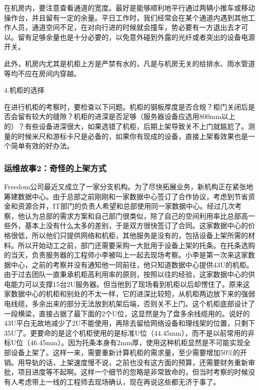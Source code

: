 \documentclass[12pt,UTF8]{ctexbook}
\begin{document}
在机房内，要注意查看通道的宽度。最好是能够顺利地平行通过两辆小推车或移动操作台，并且留有一定的余量。平日工作时，我们经常会在某个通道内遇到其他工作人员，通道空间不足，在对向行进的时候就会撞车，势必要有一方退出去才可以。留有足够余量也是十分必要的，以免意外碰到外露的光纤或者突出的设备电源开关。

此外，机房内尤其是机柜上方是严禁有水的，凡是与机房无关的给排水、雨水管道等均不应在房间内穿越。

4.机柜的选择

在进行机柜的考察时，要检查以下问题。机柜的钢板厚度是否合规？柜门关闭后是否会留有较大的缝隙？机柜的进深是否足够（服务器设备应选用800mm以上的）？有些设备进深很大，如果选错了机柜，后期上架导致关不上门就尴尬了。测量的时候米尺和游标卡尺是必备的，如果你有现成的设备，直接上架看效果也是一个简单有效的好办法。

\subsubsection{运维故事2：奇怪的上架方式}

Freedom公司最近又成立了一家分支机构。为了尽快拓展业务，新机构正在紧张地筹建数据中心。由于总部之前刚刚和一家数据中心签订了合作协议，考虑到节省资金和资源合并，IT部门的负责人希望和总部使用同一家数据中心。经过几次考察，他认为总部的需求方案和自己部门很类似，除了自己的空间利用率比总部高一些外，基本上没有什么太多的差别，于是双方很快签订了合同。这家数据中心的价格很低，所以他们只提供网络和机柜，其他服务是没有的，包括设备上架所需的材料。所以开始动工之前，部门还需要采购一大批用于设备上架的托条。在托条选购的当天，负责服务器的工程师小李被叫上一起去现场考察。小李是第一次来这家数据中心，之前的考察并没有通知他一同前往，他只知道数据中心提供43U的机柜。由于过去团队一直秉承机柜高利用率的原则，按照以往的经验，这家数据中心的供电能力可以支撑15台2U服务器。但当他到了现场看到机柜以后却愣住了。原来这家数据中心的机柜和别处的不太一样，它的进深比较短，从机柜两边放下来的强弱电线缆，多余出来的部分无法放到机架后端，否则关不上门。这个机柜底部设计了一段横梁，直接占据了最下面的2个U位，这显然是为了盘多余线缆用的。说好的43U平白无故地减少了2U不能使用，再除去留给网络设备和理线架的位置，只剩下35U了。更要命的是这个机柜使用的是标准U位（44.45mm），而不是以前常用的非标U位（46.45mm）。因为托条本身有2mm厚，使用这种机柜显然是不可能实现全部设备上架了。这样一来，需要重新计算机柜的需求量，至少需要增加50\%的开销。用导轨的话，上架速度慢不说，之前也没有这方面的预算，还需要财务重新审批，项目进度等不起啊。这样一个细节的忽略是非常致命的，但当时考察的时候没有人考虑带上一线的工程师去现场确认，现在再说这些都无济于事了。
\end{document}
